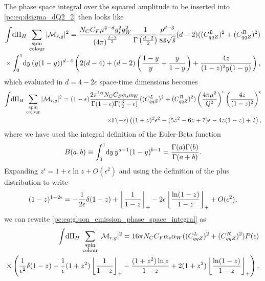 \documentclass[../main.tex]{subfiles}
\begin{document}
The phase space integral over the squared amplitude to be inserted into \cref{pc:eq:dsigma_dQ2_2} then looks like
\begin{align}
  \nonumber
  \integral{\Pi_H} \sum_{\substack{\text{spin} \\\text{colour}}} |\M_{r,g}|^2 = \frac{N_C C_F \mu^{4-d} g_s^2 g_W^2}{\pclosed{4\pi}^{\frac{d-2}{2}}} \frac{1}{\Gamma\pclosed{\frac{d-2}{2}}} \frac{p^{d-3}}{8\hat{s}\sqrt{\hat{s}}} (d-2) ((C_{qqZ}^L)^2 + (C_{qqZ}^R)^2) \\
  \times \integral[_0^1]{y} (y(1-y))^{d-4} \pclosed{2(d-4) + (d-2)\pclosed{\frac{1-y}{y} + \frac{y}{1-y}} + \frac{4z}{(1-z)^2 y(1-y)}},
\end{align}
which evaluated in \(d=4-2\epsilon\) space-time dimensions becomes
\begin{align}
  \label{pc:eq:gluon_emission_phase_space_integral}
  \nonumber
  \integral{\Pi_H} \sum_{\substack{\text{spin} \\\text{colour}}} |\M_{r,g}|^2 = (1-\epsilon) \frac{2 \pi^{\sfrac{3}{2}} N_C C_F \alpha_s \alpha_W}{\Gamma(1-\epsilon) \Gamma(\frac{3}{2}-\epsilon)} ((C_{qqZ}^L)^2 + (C_{qqZ}^R)^2) \pclosed{\frac{4\pi \mu^2}{Q^2}}^{\epsilon} \pclosed{\frac{4z}{(1-z)^2}}^\epsilon \\
  \times \Gamma(-\epsilon) \pclosed{(1+z)^2 \epsilon^2 - (5z^2-6z+7)\epsilon - 4z(1-z) + 2},
\end{align}
where we have used the integral definition of the Euler-Beta function
\begin{equation}
  B(a, b) \equiv \integral[_0^1]{y} y^{a-1}(1-y)^{b-1} = \frac{\Gamma(a)\Gamma(b)}{\Gamma(a+b)}.
\end{equation}
Expanding \(z^{\epsilon} = 1 + \epsilon \ln z + O(\epsilon^2)\) and using the definition of the plus distribution  to write
\begin{equation}
  (1-z)^{1-2\epsilon} = -\frac{1}{2\epsilon} \delta(1-z) + \plusdist{\frac{1}{1-z}} -2\epsilon \plusdist{\frac{\ln(1-z)}{1-z}} + O(\epsilon^2),
\end{equation}
we can rewrite \cref{pc:eq:gluon_emission_phase_space_integral} as
\begin{align}
  \nonumber
  \integral{\Pi_H} \sum_{\substack{\text{spin} \\\text{colour}}} |\M_{r,g}|^2 = 16 \pi N_C C_F \alpha_s \alpha_W ((C_{qqZ}^L)^2 + (C_{qqZ}^R)^2) P(\epsilon) \\
  \times \pclosed{\frac{1}{\epsilon^2} \delta(1-z) - \frac{1}{\epsilon} (1+z^2)\plusdist{\frac{1}{1-z}} - \frac{(1+z^2)\ln z}{1-z} + 2(1+z^2)\plusdist{\frac{\ln(1-z)}{1-z}}},
\end{align}
\end{document}
